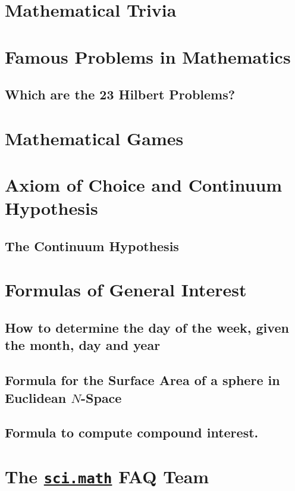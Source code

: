 \documentclass[a4paper]{report}
\begin{document}
\chapter{Mathematical Trivia}
  
\chapter{Famous Problems in Mathematics}
  
  
  \section{Which are the 23 Hilbert Problems?}
    
  
\chapter{Mathematical Games}
  
\chapter{Axiom of Choice and Continuum Hypothesis}
  
  
  \section{The Continuum Hypothesis}
    
\chapter{Formulas of General Interest}
  \section{How to determine the day of the week, given the month,
             day and year}
    
   
  \section{Formula for the Surface Area of a sphere in Euclidean $N$-Space}
    
  \section{Formula to compute compound interest.}
    
%   
\chapter{The \href{news://sci.math}{\texttt{sci.math}} FAQ Team}
  

\cleardoublepage
{}
{}
\nocite{*}


\end{document}
